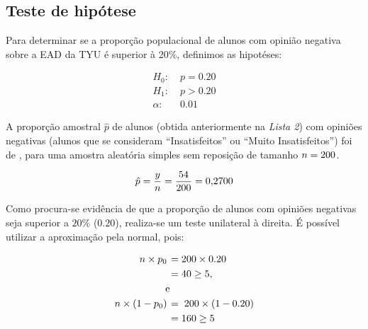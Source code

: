 
\subsection{Teste de hipótese}
\label{questao:4a}


	Para determinar se a proporção populacional de alunos com opinião negativa
	sobre a EAD da TYU é superior à 20\%, definimos as hipotéses:

	\begin{align*} 
		H_0\!:   &\; p = 0.20 \\
		H_1\!:   &\; p > 0.20  \\
		\alpha\!:&\; 0.01
	\end{align*}

	A proporção amostral $\hat{p}$ de alunos (obtida anteriormente na \textit{Lista 2}) com opiniões
	negativas (alunos que se consideram ``Insatisfeitos'' ou ``Muito Insatisfeitos'')
	foi de \QUATROpAmostral, para uma amostra aleatória simples sem reposição de tamanho $n = 200$.

	\begin{align*} 
		\hat{p}  = \frac{y}{n} = {\frac{\num{54.0000}}{200}} = \num{0.2700}
	\end{align*}
	
	Como procura-se evidência de que a proporção de alunos com opiniões negativas seja superior
	a $20\%$ ($0.20$), realiza-se um teste unilateral à direita.
	É possível utilizar a aproximação pela normal, pois:

	\begin{align*}
	  n \times p_0\!  &\; = 200 \times 0.20 \\
	  &\; = 40 \geq 5 ,\\
	  & \text{e} \\
	  n \times (1 - p_0)\!	&\;=\; 200 \times (1 - 0.20) \\
	  &\;= 160  \geq 5 \\
	\end{align*}

